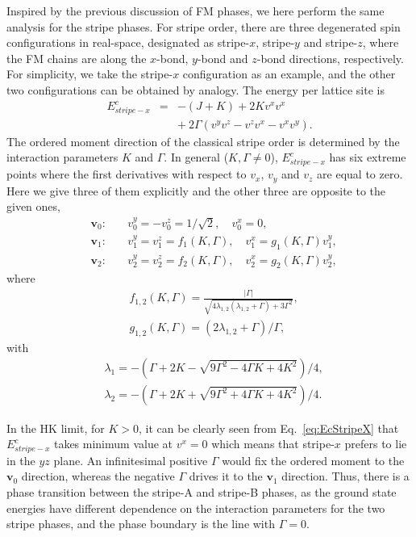 \documentclass[aps,prb,reprint,amsfonts,amsmath,amssymb,showpacs,groupedaddress,superscriptaddress]{revtex4-1}
\begin{document}
Inspired by the previous discussion of FM phases, we here perform the same analysis for the stripe phases. For stripe order, there are three degenerated spin configurations in real-space, designated as stripe-$x$, stripe-$y$ and stripe-$z$, where the FM chains are along the $x$-bond, $y$-bond and $z$-bond directions, respectively. For simplicity, we take the stripe-$x$ configuration as an example, and the other two configurations can be obtained by analogy. The energy per lattice site is
\begin{eqnarray}
    E_{stripe-x}^{c} & = & -(J + K) + 2 K v^x v^x \nonumber \\
        & & +\: 2 \Gamma (v^y v^z - v^z v^x - v^x v^y).
        \label{eq:EcStripeX}
\end{eqnarray}
The ordered moment direction of the classical stripe order is determined by the interaction parameters $K$ and $\Gamma$. In general ($K,\Gamma \neq 0$), $E_{stripe-x}^{c}$ has six extreme points where the first derivatives with respect to $v_x$, $v_y$ and $v_z$ are equal to zero. Here we give three of them explicitly and the other three are opposite to the given ones,
\begin{subequations}
    \label{eq:whole}
    \begin{eqnarray}
        & \bm{v}_0:& \quad v_{0}^{y}=-v_{0}^{z} = 1/\sqrt{2}, \quad v_{0}^{x} = 0, \label{eq:v0} \\
        & \bm{v}_1:& \quad v_{1}^{y}=v_{1}^{z} = f_{1}(K, \Gamma), \quad v_{1}^{x} = g_{1}(K, \Gamma) v_{1}^{y}, \label{eq:v1} \\
        & \bm{v}_2:& \quad v_{2}^{y}=v_{2}^{z} = f_{2}(K, \Gamma), \quad v_{2}^{x} = g_{2}(K, \Gamma) v_{2}^{y}, \label{eq:v2}
    \end{eqnarray}
\end{subequations}
where
\begin{align}
& f_{1,2}(K, \Gamma)= \frac{|\Gamma|}{\sqrt{4 \lambda_{1,2} (\lambda_{1,2} + \Gamma) + 3 \Gamma^{2}}}, \nonumber \\
& g_{1,2}(K, \Gamma)= (2 \lambda_{1,2} + \Gamma) / \Gamma, \nonumber
\end{align}
with
\begin{align}
& \lambda_{1}=- (\Gamma +2 K - \sqrt{9\Gamma^2 - 4 \Gamma K + 4 K^2}) / 4, \nonumber \\
& \lambda_{2}=-(\Gamma +2 K + \sqrt{9\Gamma^2 + 4 \Gamma K + 4 K^2}) / 4. \nonumber
\end{align}

In the HK limit, for $K>0$, it can be clearly seen from Eq.~\eqref{eq:EcStripeX} that $E_{stripe-x}^{c}$ takes minimum value at $v^x = 0$ which means that stripe-$x$ prefers to lie in the $yz$ plane. An infinitesimal positive $\Gamma$ would fix the ordered moment to the $\bm{v}_0$ direction, whereas the negative $\Gamma$ drives it to the $\bm{v}_1$ direction. Thus, there is a phase transition between the stripe-A and stripe-B phases, as the ground state energies have different dependence on the interaction parameters for the two stripe phases, and the phase boundary is the line with $\Gamma=0$.
\end{document}

